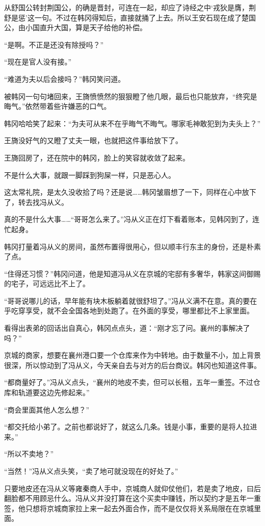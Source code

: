 从舒国公转封荆国公，的确是晋封，可连在一起，却应了诗经之中‘戎狄是膺，荆舒是惩’这一句。不过在韩冈得知后，直接就捅了上去。所以王安石现在成了楚国公，由小国直升大国，算是天子给他的补偿。

“是啊。不正是还没有除授吗？”

“现在是官人没有接。”

“难道为夫以后会接吗？”韩冈笑问道。

被韩冈一句句堵回来，王旖愤愤然的狠狠瞪了他几眼，最后也只能放弃，“终究是晦气。”依然带着些许嫌恶的口气。

韩冈哈哈笑了起来：“为夫可从来不在乎晦气不晦气。哪家毛神敢犯到为夫头上？”

王旖没好气的又瞪了丈夫一眼，也就把这件事给放下了。

王旖回房了，还在院中的韩冈，脸上的笑容就收敛了起来。

不是什么大事，就跟一脚踩到狗屎一样，只是恶心人。

这太常礼院，是太久没收拾了吗？还是说……韩冈皱眉想了一下，同样在心中放下了，转去找冯从义。

真的不是什么大事……“哥哥怎么来了。”冯从义正在灯下看着账本，见韩冈到了，连忙起身。

韩冈打量着冯从义的房间，虽然布置得很用心，但以顺丰行东主的身份，还是朴素了点。

“住得还习惯？”韩冈问道，他是知道冯从义在京城的宅邸有多奢华，韩家这间御赐的宅子，可远远比不上了。

“哥哥说哪儿的话，早年能有块木板躺着就很舒坦了。”冯从义满不在意。真的要在乎吃穿享受，就不会全国各地到处跑了。在外面的享受，哪里都比不上家里面。

看得出表弟的回话出自真心，韩冈点点头，道：“刚才忘了问。襄州的事解决了吗？”

京城的商家，想要在襄州港口要一个仓库来作为中转地。由于数量不小，加上背景很深，所以惊动到了冯从义，今天亲自去与对方的后台商议。韩冈也知道这件事。

“都商量好了。”冯从义点头，“襄州的地皮不卖，但可以长租，五年一重签。不过仓库和轨道要这边先修起来。”

“商会里面其他人怎么想？”

“都交托给小弟了。之前也都说好了，就这么几条。钱是小事，重要的是将人拉进来。”

“所以不卖地？”

“当然！”冯从义点头笑，“卖了地可就没现在的好处了。”

只要地皮还在冯从义等雍秦商人手中，京城商人就仰仗他们，若是卖了地皮，曰后翻脸都不用顾忌什么。冯从义并没打算在这个买卖中赚钱，所以契约才是五年一重签，他只想将京城商家拉上来一起去外面合作，而不是仅仅将关系局限在在京城里面。

